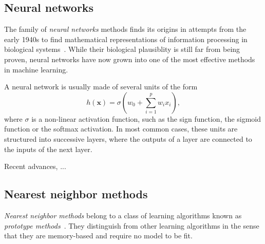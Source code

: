 \subsection{Neural networks}

The family of \textit{neural networks} methods finds its origins in attempts
from the early 1940s to find mathematical representations of information
processing in biological systems~\citep{bishop:2006}. While their biological
plausiblity is still far from being proven, neural networks have now grown into
one of the most effective methods in machine learning.

A neural network is usually made of several units of the form
\begin{equation}
h(\mathbf{x}) = \sigma(w_0 + \sum_{i=1}^p w_i x_i),
\end{equation}
where $\sigma$ is a non-linear activation function, such as the sign function,
the sigmoid function or the softmax activation. In most common cases, these units are
structured into successive layers, where the outputs of a layer are connected
to the inputs of the next layer.

Recent advances, ...






\subsection{Nearest neighbor methods}

\textit{Nearest neighbor methods} belong to a class of learning algorithms
known as \textit{prototype methods}~\citep{hastie:2005}. They distinguish from
other learning algorithms in the sense that they are memory-based and require
no model to be fit.

